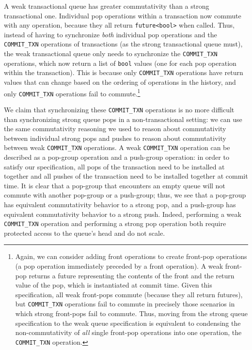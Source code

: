 A weak transactional queue has greater commutativity than a strong transactional one. Individual pop operations within a transaction now commute with any operation, because they all return \texttt{future<bool>} when called. Thus, instead of having to synchronize \emph{both} individual pop operations and the \texttt{COMMIT\_TXN} operations of transactions (as the strong transactional queue must), the weak transactional queue only needs to synchronize the \texttt{COMMIT\_TXN} operations, which now return a list of \texttt{bool} values (one for each pop operation within the transaction). This is because only \texttt{COMMIT\_TXN} operations have return values that can change based on the ordering of operations in the history, and only \texttt{COMMIT\_TXN} operations fail to commute.\footnote{Again, we can consider adding front operations to create front-pop operations (a pop operation immediately preceded by a front operation). A weak front-pop returns a future representing the contents of the front and the return value of the pop, which is instantiated at commit time. Given this specification, all weak front-pops commute (because they all return futures), but \texttt{COMMIT\_TXN} operations fail to commute in precisely those scenarios in which strong front-pops fail to commute. Thus, moving from the strong queue specification to the weak queue specification is equivalent to condensing the non-commutativity of \emph{all} single front-pop operations into one operation, the \texttt{COMMIT\_TXN} operation.}

We claim that synchronizing these \texttt{COMMIT\_TXN} operations is no more difficult than synchronizing strong queue pops in a non-transactional setting: we can use the same commutativity reasoning we used to reason about commutativity between individual strong pops and pushes to reason about commutativity between weak \texttt{COMMIT\_TXN} operations. A weak \texttt{COMMIT\_TXN} operation can be described as a pop-group operation and a push-group operation: in order to satisfy our specification, all pops of the transaction need to be installed at together and all pushes of the transaction need to be installed together at commit time. It is clear that a pop-group that encounters an empty queue will not commute with another pop-group or a push-group; thus, we see that a pop-group has equivalent commutativity behavior to a strong pop, and a push-group has equivalent commutativity behavior to a strong push. Indeed, performing a weak \texttt{COMMIT\_TXN} operation and performing a strong pop operation both require protected access to the queue's head and do not scale.

